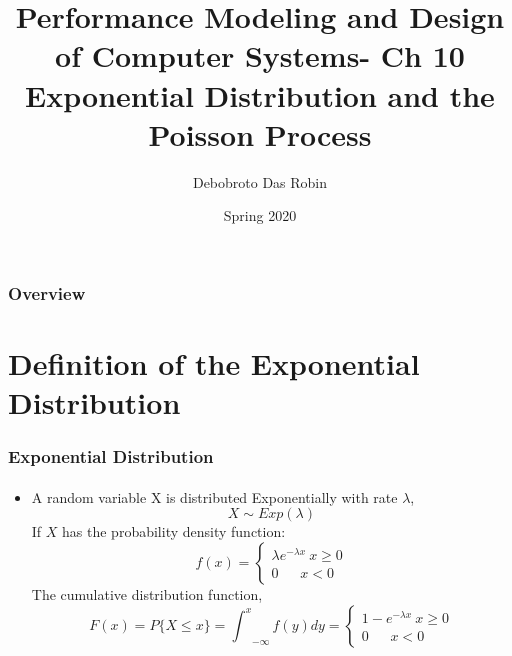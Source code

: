 \documentclass{beamer}
\title{Performance Modeling and
Design of Computer Systems- Ch 10 \\
Exponential Distribution and the Poisson Process}
\author{Debobroto Das Robin} %
\institute{Kent State University}
\date{Spring 2020}
\begin{document}
\begin{frame}
        \titlepage
        \begin{center}
    \href{mailto:drobin@kent.edu}{}
        \end{center}
\end{frame}

\begin{frame}
\frametitle{Overview} %
\tableofcontents %
\end{frame}



\section{ Definition of the Exponential Distribution}



\begin{frame} 
\frametitle{ Exponential Distribution}
\framesubtitle{\textbf{\textit{}}}
\begin{itemize}
\item A random variable X is distributed Exponentially with rate $\lambda$,
$$X \sim Exp(\lambda)$$
If $X$  has the probability density function:
\begin{equation*}
f(x) = \begin{cases}
\lambda e^{- \lambda x} \: x \geq 0\\
0 \: \: \: \: \: \: \:  x <0
\end{cases}
\end{equation*}
The cumulative distribution function,
\begin{equation*}
F(x) = P\{ X \leq x \} = {{\int}^x}_{-\infty} f(y)dy = 
 \begin{cases}
1 -  e^{- \lambda x} \: x \geq 0\\
0 \: \: \: \: \: \: \:  x <0
\end{cases}
\end{equation*}
\end{itemize}
	
\end{frame}
\end{document}
